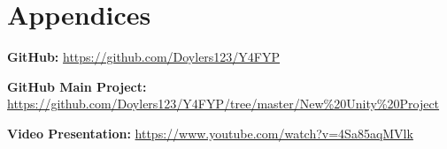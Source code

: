 \chapter{Appendices}

\textbf {GitHub:} \newline \bigskip
\href{https://github.com/Doylers123/Y4FYP}{https://github.com/Doylers123/Y4FYP}

\textbf {GitHub Main Project:} \newline \bigskip
\href{https://github.com/Doylers123/Y4FYP/tree/master/New\%20Unity\%20Project}{https://github.com/Doylers123/Y4FYP/tree/master/New\%20Unity\%20Project}

\textbf {Video Presentation:} \newline \bigskip
\href{https://www.youtube.com/watch?v=4Sa85aqMVlk}{https://www.youtube.com/watch?v=4Sa85aqMVlk}